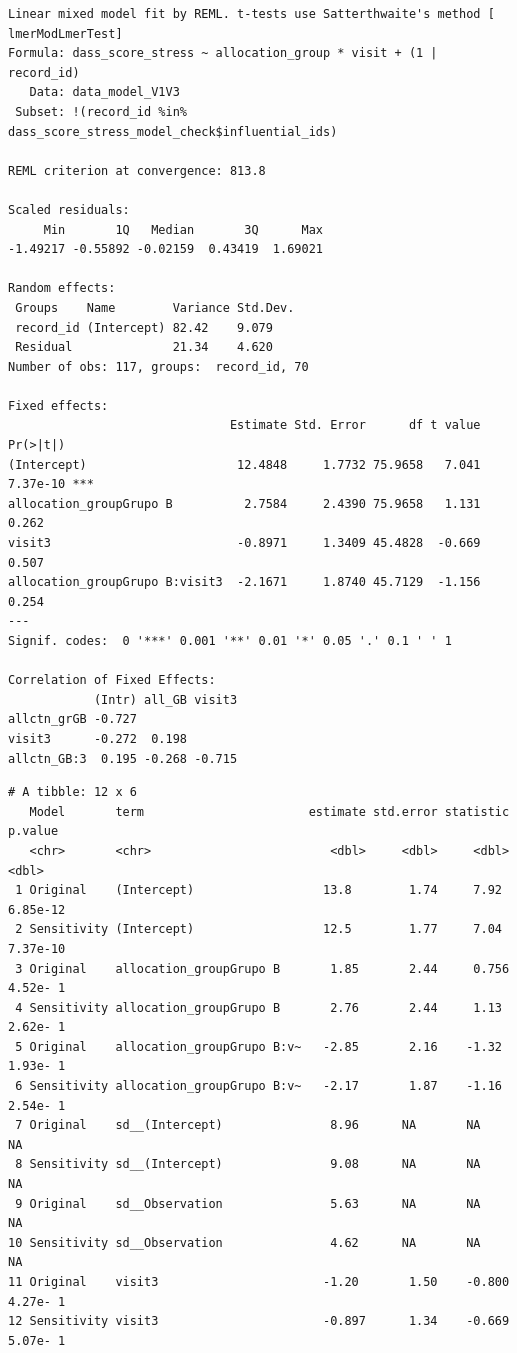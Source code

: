 \documentclass[
  letterpaper,
  DIV=11,
  numbers=noendperiod]{scrartcl}
\newenvironment{Shaded}{\begin{snugshade}}{\end{snugshade}}
\newcommand{\NormalTok}[1]{\textcolor[rgb]{0.00,0.23,0.31}{#1}}
\newcommand{\SpecialCharTok}[1]{\textcolor[rgb]{0.37,0.37,0.37}{#1}}
\begin{document}
\begin{verbatim}
Linear mixed model fit by REML. t-tests use Satterthwaite's method [
lmerModLmerTest]
Formula: dass_score_stress ~ allocation_group * visit + (1 | record_id)
   Data: data_model_V1V3
 Subset: !(record_id %in% dass_score_stress_model_check$influential_ids)

REML criterion at convergence: 813.8

Scaled residuals: 
     Min       1Q   Median       3Q      Max 
-1.49217 -0.55892 -0.02159  0.43419  1.69021 

Random effects:
 Groups    Name        Variance Std.Dev.
 record_id (Intercept) 82.42    9.079   
 Residual              21.34    4.620   
Number of obs: 117, groups:  record_id, 70

Fixed effects:
                               Estimate Std. Error      df t value Pr(>|t|)    
(Intercept)                     12.4848     1.7732 75.9658   7.041 7.37e-10 ***
allocation_groupGrupo B          2.7584     2.4390 75.9658   1.131    0.262    
visit3                          -0.8971     1.3409 45.4828  -0.669    0.507    
allocation_groupGrupo B:visit3  -2.1671     1.8740 45.7129  -1.156    0.254    
---
Signif. codes:  0 '***' 0.001 '**' 0.01 '*' 0.05 '.' 0.1 ' ' 1

Correlation of Fixed Effects:
            (Intr) all_GB visit3
allctn_grGB -0.727              
visit3      -0.272  0.198       
allctn_GB:3  0.195 -0.268 -0.715
\end{verbatim}

\begin{Shaded}
\end{Shaded}

\begin{verbatim}
# A tibble: 12 x 6
   Model       term                       estimate std.error statistic   p.value
   <chr>       <chr>                         <dbl>     <dbl>     <dbl>     <dbl>
 1 Original    (Intercept)                  13.8        1.74     7.92   6.85e-12
 2 Sensitivity (Intercept)                  12.5        1.77     7.04   7.37e-10
 3 Original    allocation_groupGrupo B       1.85       2.44     0.756  4.52e- 1
 4 Sensitivity allocation_groupGrupo B       2.76       2.44     1.13   2.62e- 1
 5 Original    allocation_groupGrupo B:v~   -2.85       2.16    -1.32   1.93e- 1
 6 Sensitivity allocation_groupGrupo B:v~   -2.17       1.87    -1.16   2.54e- 1
 7 Original    sd__(Intercept)               8.96      NA       NA     NA       
 8 Sensitivity sd__(Intercept)               9.08      NA       NA     NA       
 9 Original    sd__Observation               5.63      NA       NA     NA       
10 Sensitivity sd__Observation               4.62      NA       NA     NA       
11 Original    visit3                       -1.20       1.50    -0.800  4.27e- 1
12 Sensitivity visit3                       -0.897      1.34    -0.669  5.07e- 1
\end{verbatim}
\end{document}
